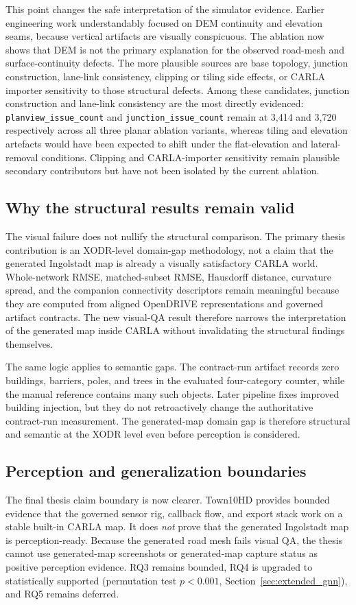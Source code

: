 This point changes the safe interpretation of the simulator evidence. Earlier engineering work understandably focused on DEM continuity and elevation seams, because vertical artifacts are visually conspicuous. The ablation now shows that DEM is not the primary explanation for the observed road-mesh and surface-continuity defects. The more plausible sources are base topology, junction construction, lane-link consistency, clipping or tiling side effects, or CARLA importer sensitivity to those structural defects. Among these candidates, junction construction and lane-link consistency are the most directly evidenced: \texttt{planview\_issue\_count} and \texttt{junction\_issue\_count} remain at 3{,}414 and 3{,}720 respectively across all three planar ablation variants, whereas tiling and elevation artefacts would have been expected to shift under the flat-elevation and lateral-removal conditions. Clipping and CARLA-importer sensitivity remain plausible secondary contributors but have not been isolated by the current ablation.

\subsection{Why the structural results remain valid}
The visual failure does not nullify the structural comparison. The primary thesis contribution is an XODR-level domain-gap methodology, not a claim that the generated Ingolstadt map is already a visually satisfactory CARLA world. Whole-network RMSE, matched-subset RMSE, Hausdorff distance, curvature spread, and the companion connectivity descriptors remain meaningful because they are computed from aligned OpenDRIVE representations and governed artifact contracts. The new visual-QA result therefore narrows the interpretation of the generated map inside CARLA without invalidating the structural findings themselves.

The same logic applies to semantic gaps. The contract-run artifact records zero buildings, barriers, poles, and trees in the evaluated four-category counter, while the manual reference contains many such objects. Later pipeline fixes improved building injection, but they do not retroactively change the authoritative contract-run measurement. The generated-map domain gap is therefore structural and semantic at the XODR level even before perception is considered.

\subsection{Perception and generalization boundaries}
The final thesis claim boundary is now clearer. Town10HD provides bounded evidence that the governed sensor rig, callback flow, and export stack work on a stable built-in CARLA map. It does \emph{not} prove that the generated Ingolstadt map is perception-ready. Because the generated road mesh fails visual QA, the thesis cannot use generated-map screenshots or generated-map capture status as positive perception evidence. RQ3 remains bounded, RQ4 is upgraded to statistically supported (permutation test $p<0.001$, Section~\ref{sec:extended_gnn}), and RQ5 remains deferred.

